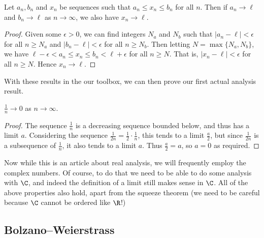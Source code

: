 \documentclass[a4paper]{scrartcl}
\begin{document}
\begin{proposition}
	Let $a_n, b_n$ and $x_n$ be sequences such that $a_n \leq x_n \leq b_n$ for all $n$. Then if $a_n \rightarrow \ell$ and $b_n \rightarrow \ell$ as $n \rightarrow \infty$, we also have $x_n \rightarrow \ell$.
\end{proposition}
\begin{proof}
Given some $\epsilon > 0$, we can find integers $N_a$ and $N_b$ such that $|a_n - \ell| < \epsilon$  for all $n \geq N_a$ and $|b_n - \ell| < \epsilon$ for all $n \geq N_b$. Then letting $N = \max\{N_a, N_b\}$, we have $\ell - \epsilon < a_n \leq x_n \leq b_n < \ell + \epsilon$ for all $n \geq N$. That is, $|x_n - \ell| < \epsilon$ for all $n \geq N$. Hence $x_n \rightarrow \ell$.
\end{proof}


With these results in the our toolbox, we can then prove our first actual analysis result.

\begin{lemma}
	$\frac{1}{n} \rightarrow 0$ as $n \rightarrow \infty$.
\end{lemma}
\begin{proof}
	The sequence $\frac{1}{n}$ is a decreasing sequence bounded below, and thus has a limit $a$. Considering the sequence $\frac{1}{2n} = \frac{1}{2}\cdot \frac{1}{n}$, this tends to a limit $\frac{a}{2}$, but since $\frac{1}{2n}$ is a subsequence of $\frac{1}{n}$, it also tends to a limit $a$. Thus $\frac{a}{2}=a$, so $a = 0$ as required.
\end{proof}






Now while this is an article about real analysis, we will frequently employ the complex numbers. Of course, to do that we need to be able to do some analysis with $\C$, and indeed the definition of a limit still makes sense in $\C$. All of the above properties also hold, apart from the squeeze theorem (we need to be careful because $\C$ cannot be ordered like $\R$!)

\subsection{Bolzano–Weierstrass}
\end{document}
